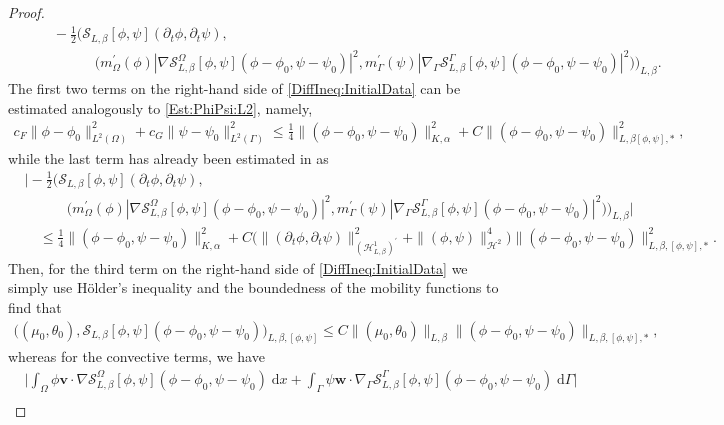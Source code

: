 \documentclass[10pt,reqno]{amsart}
\theoremstyle{remark}
\numberwithin{equation}{section}
\newcommand{\abs}[1]{| #1 |}
\newcommand{\Bigabs}[1]{\Big| #1 \Big|}
\newcommand{\norm}[1]{\| #1 \|}
\newcommand{\bv}{\mathbf{v}}
\newcommand{\bw}{\mathbf{w}}
\newcommand{\intO}{\int_\Omega}
\newcommand{\intG}{\int_\Gamma}
\newcommand{\dx}{\;\mathrm{d}x}
\newcommand{\dG}{\;\mathrm d\Ga}
\newcommand{\delt}{\partial_{t}}
\newcommand{\Grad}{\nabla}
\newcommand{\Gradg}{\nabla_\Ga}
\newcommand{\Om}{\Omega}
\newcommand{\Ga}{\Gamma}
\begin{document}
\begin{proof}
\begin{align}
        &\qquad - \frac12\Big(\mathcal{S}_{L,\beta}[\phi,\psi](\delt\phi,\delt\psi), \nonumber \\
        &\qquad\qquad\quad \big(m_\Om^\prime(\phi)\abs{\Grad\mathcal{S}_{L,\beta}^\Om[\phi,\psi](\phi - \phi_0,\psi - \psi_0)}^2, m_\Ga^\prime(\psi)\abs{\Gradg\mathcal{S}_{L,\beta}^\Ga[\phi,\psi](\phi - \phi_0, \psi - \psi_0)}^2\big)\Big)_{L,\beta}. \nonumber
    \end{align}
    The first two terms on the right-hand side of \eqref{DiffIneq:InitialData} can be estimated analogously to \eqref{Est:PhiPsi:L2}, namely,
    \begin{align*}
        c_F\norm{\phi - \phi_0}_{L^2(\Om)}^2 + c_G\norm{\psi - \psi_0}_{L^2(\Ga)}^2 \leq \frac14\norm{(\phi - \phi_0, \psi - \psi_0)}_{K,\alpha}^2 + C\norm{(\phi - \phi_0, \psi - \psi_0)}_{L,\beta[\phi,\psi],\ast}^2,
    \end{align*}
    while the last term has already been estimated in \cite[Eqn.~(5.62)]{Stange2025} as
    \begin{align*}
        &\bigg\vert - \frac12\Big(\mathcal{S}_{L,\beta}[\phi,\psi](\delt\phi,\delt\psi), \nonumber \\
        &\qquad\quad\big(m_\Om^\prime(\phi)\abs{\Grad\mathcal{S}_{L,\beta}^\Om[\phi,\psi](\phi - \phi_0,\psi - \psi_0)}^2, m_\Ga^\prime(\psi)\abs{\Gradg\mathcal{S}_{L,\beta}^\Ga[\phi,\psi](\phi - \phi_0, \psi - \psi_0)}^2\big)\Big)_{L,\beta}\bigg\vert \\
        &\quad \leq \frac14\norm{(\phi - \phi_0, \psi - \psi_0)}_{K,\alpha}^2 + C\Big(\norm{(\delt\phi,\delt\psi)}_{(\mathcal{H}^1_{L,\beta})^\prime}^2 + \norm{(\phi,\psi)}_{\mathcal{H}^2}^4\Big)\norm{(\phi - \phi_0, \psi - \psi_0)}_{L,\beta,[\phi,\psi],\ast}^2.
    \end{align*}
    Then, for the third term on the right-hand side of \eqref{DiffIneq:InitialData} we simply use Hölder's inequality and the boundedness of the mobility functions to find that
    \begin{align*}
        \big((\mu_0,\theta_0),\mathcal{S}_{L,\beta}[\phi,\psi](\phi - \phi_0,\psi - \psi_0)\big)_{L,\beta,[\phi,\psi]} \leq C\norm{(\mu_0,\theta_0)}_{L,\beta}\norm{(\phi - \phi_0, \psi - \psi_0)}_{L,\beta,[\phi,\psi],\ast},
    \end{align*}
    whereas for the convective terms, we have
    \begin{align*}
        &\Bigabs{\intO \phi\bv\cdot\Grad\mathcal{S}_{L,\beta}^\Om[\phi,\psi](\phi - \phi_0, \psi - \psi_0)\dx + \intG \psi\bw\cdot\Gradg\mathcal{S}_{L,\beta}^\Ga[\phi,\psi](\phi - \phi_0, \psi - \psi_0)\dG } \\

\end{align*}
\end{proof}
\end{document}
